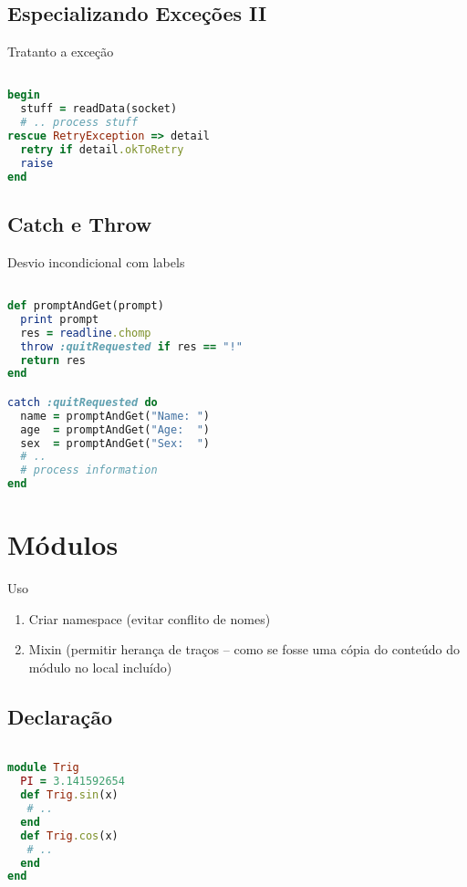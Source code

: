 \documentclass[serif,mathserif]{book}
\begin{document}
\section{Especializando Exceções II}

Tratanto a exceção

\begin{lstlisting}[language=ruby]

begin
  stuff = readData(socket)
  # .. process stuff
rescue RetryException => detail
  retry if detail.okToRetry
  raise
end
\end{lstlisting}

\section{Catch e Throw}

Desvio incondicional com labels

\begin{lstlisting}[language=ruby]

def promptAndGet(prompt)
  print prompt
  res = readline.chomp
  throw :quitRequested if res == "!"
  return res
end

catch :quitRequested do
  name = promptAndGet("Name: ")
  age  = promptAndGet("Age:  ")
  sex  = promptAndGet("Sex:  ")
  # ..
  # process information
end
\end{lstlisting}

\chapter{Módulos}
Uso

\begin{enumerate}
  \item Criar namespace (evitar conflito de nomes)
  \item Mixin (permitir herança de traços – como se fosse uma cópia do conteúdo do módulo no local incluído)
\end{enumerate}

\section{Declaração}

\begin{lstlisting}[language=ruby]

module Trig
  PI = 3.141592654
  def Trig.sin(x)
   # ..
  end
  def Trig.cos(x)
   # ..
  end
end
\end{lstlisting}
\end{document}

